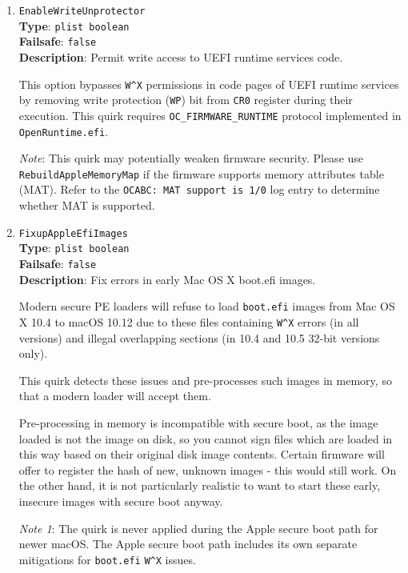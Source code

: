 \documentclass[]{article}
\begin{document}
\begin{enumerate}
  \emph{Note}: The need for this option is dependent on the availability of safe mode.
  It can be enabled when booting to safe mode fails.

\item
  \texttt{EnableWriteUnprotector}\\
  \textbf{Type}: \texttt{plist\ boolean}\\
  \textbf{Failsafe}: \texttt{false}\\
  \textbf{Description}: Permit write access to UEFI runtime services code.

  This option bypasses \texttt{W\^{}X} permissions in code pages of UEFI runtime
  services by removing write protection (\texttt{WP}) bit from \texttt{CR0}
  register during their execution. This quirk requires \texttt{OC\_FIRMWARE\_RUNTIME}
  protocol implemented in \texttt{OpenRuntime.efi}.

  \emph{Note}: This quirk may potentially weaken firmware security. Please use
  \texttt{RebuildAppleMemoryMap} if the firmware supports memory attributes table (MAT).
  Refer to the \texttt{OCABC: MAT support is 1/0} log entry to determine whether MAT is supported.

\item
  \texttt{FixupAppleEfiImages}\\
  \textbf{Type}: \texttt{plist\ boolean}\\
  \textbf{Failsafe}: \texttt{false}\\
  \textbf{Description}: Fix errors in early Mac OS X boot.efi images.

  Modern secure PE loaders will refuse to load \texttt{boot.efi} images from
  Mac OS X 10.4 to macOS 10.12 due to these files containing \texttt{W\^{}X} errors
  (in all versions) and illegal overlapping sections (in 10.4 and 10.5 32-bit
  versions only).

  This quirk detects these issues and pre-processes such images in memory,
  so that a modern loader will accept them.

  Pre-processing in memory is incompatible with secure boot, as the image loaded
  is not the image on disk, so you cannot sign files which are loaded in this way
  based on their original disk image contents.
  Certain firmware will offer to register the hash of new, unknown images - this would
  still work. On the other hand, it is not particularly realistic to want to
  start these early, insecure images with secure boot anyway.

  \emph{Note 1}: The quirk is never applied during the Apple secure boot path for
  newer macOS. The Apple secure boot path includes its own separate mitigations
  for \texttt{boot.efi} \texttt{W\^{}X} issues.


\end{enumerate}
\end{document}
